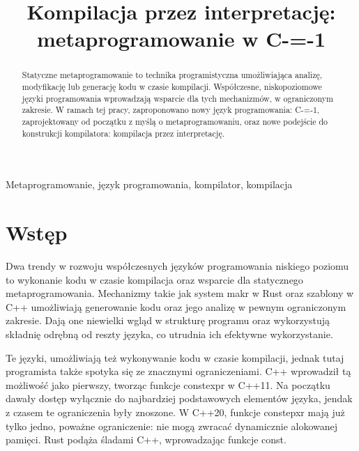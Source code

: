 \documentclass[conference]{IEEEtran}
\begin{document}
\title{Kompilacja przez interpretację: metaprogramowanie w C-=-1
}

\author{
}

\maketitle

\begin{abstract}
Statyczne metaprogramowanie to technika programistyczna umożliwiająca analizę, modyfikację lub generację kodu w czasie kompilacji.
Współczesne, niskopoziomowe języki programowania wprowadzają wsparcie dla tych mechanizmów, w ograniczonym zakresie.
W ramach tej pracy, zaproponowano nowy język programowania: C-=-1, zaprojektowany od początku z myślą o metaprogramowaniu, oraz nowe podejście do konstrukcji kompilatora: kompilacja przez interpretację.
\end{abstract}

\begin{IEEEkeywords}
Metaprogramowanie, język programowania, kompilator, kompilacja
\end{IEEEkeywords}

\section{Wstęp}
Dwa trendy w rozwoju współczesnych języków programowania niskiego poziomu to wykonanie kodu w czasie kompilacja oraz wsparcie dla statycznego metaprogramowania.
Mechanizmy takie jak system makr w Rust oraz szablony w C++ umożliwiają generowanie kodu oraz jego analizę w pewnym ograniczonym zakresie.
Dają one niewielki wgląd w strukturę programu oraz wykorzystują składnię odrębną od reszty języka, co utrudnia ich efektywne wykorzystanie.

Te języki, umożliwiają też wykonywanie kodu w czasie kompilacji, jednak tutaj programista także spotyka się ze znacznymi ograniczeniami.
C++ wprowadził tą możliwość jako pierwszy, tworząc funkcje constexpr w C++11.
Na początku dawały dostęp wyłącznie do najbardziej podstawowych elementów języka, jendak z czasem te ograniczenia były znoszone.
W C++20, funkcje constepxr mają już tylko jedno, poważne ograniczenie: nie mogą zwracać dynamicznie alokowanej pamięci.
Rust podąża śladami C++, wprowadzając funkcje const.
\end{document}
